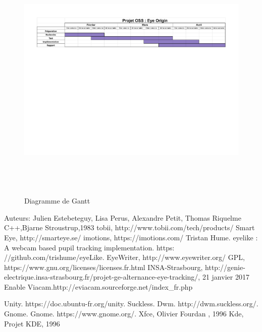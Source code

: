 \documentclass[a4paper, 12pt]{report}
\begin{document}
\begin{figure}[!ht]
\centering
\includegraphics[height=12cm]{Diagrame.pdf}
\vfill
\caption{Diagramme de Gantt}
\end{figure}

        \centering
            \begin{thebibliography}{}
 Auteurs: Julien Estebeteguy, Lisa Perus, Alexandre Petit, Thomas Riquelme
 C++,Bjarne Stroustrup,1983
 tobii, http://www.tobii.com/tech/products/
 Smart Eye, http://smarteye.se/
 imotions, https://imotions.com/
 Tristan Hume. eyelike : A webcam based pupil tracking implementation. https:
//github.com/trishume/eyeLike.
 EyeWriter, http://www.eyewriter.org/
 GPL, https://www.gnu.org/licenses/licenses.fr.html
 INSA-Strasbourg, http://genie-electrique.insa-strasbourg.fr/projet-ge-alternance-eye-tracking/, 21 janvier 2017
 Enable Viacam.http://eviacam.sourceforge.net/index\_fr.php

 Unity. https://doc.ubuntu-fr.org/unity.
 Suckless. Dwm. http://dwm.suckless.org/.
 Gnome. Gnome. https://www.gnome.org/.
 Xfce, Olivier Fourdan , 1996
 Kde, Projet KDE, 1996





\end{thebibliography}{}
\end{document}
